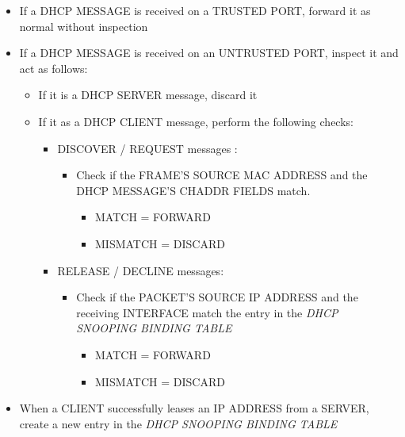 \begin{itemize}
\tightlist
\item
  If a DHCP MESSAGE is received on a TRUSTED PORT, forward it as normal
  without inspection
\item
  If a DHCP MESSAGE is received on an UNTRUSTED PORT, inspect it and act
  as follows:

  \begin{itemize}
  \tightlist
  \item
    If it is a DHCP SERVER message, discard it
  \item
    If it as a DHCP CLIENT message, perform the following checks:

    \begin{itemize}
    \tightlist
    \item
      DISCOVER / REQUEST messages :

      \begin{itemize}
      \tightlist
      \item
        Check if the FRAME'S SOURCE MAC ADDRESS and the DHCP MESSAGE'S
        CHADDR FIELDS match.

        \begin{itemize}
        \tightlist
        \item
          MATCH = FORWARD
        \item
          MISMATCH = DISCARD
        \end{itemize}
      \end{itemize}
    \item
      RELEASE / DECLINE messages:

      \begin{itemize}
      \tightlist
      \item
        Check if the PACKET'S SOURCE IP ADDRESS and the receiving
        INTERFACE match the entry in the \emph{DHCP SNOOPING BINDING
        TABLE}

        \begin{itemize}
        \tightlist
        \item
          MATCH = FORWARD
        \item
          MISMATCH = DISCARD
        \end{itemize}
      \end{itemize}
    \end{itemize}
  \end{itemize}
\item
  When a CLIENT successfully leases an IP ADDRESS from a SERVER, create
  a new entry in the \emph{DHCP SNOOPING BINDING TABLE}
\end{itemize}

